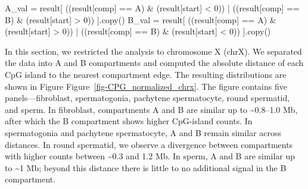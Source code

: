 \documentclass[
  a4paper,
  openany]{scrbook}
\newenvironment{Shaded}{\begin{snugshade}}{\end{snugshade}}
\newcommand{\DecValTok}[1]{\textcolor[rgb]{0.69,0.50,0.00}{#1}}
\newcommand{\NormalTok}[1]{\textcolor[rgb]{0.12,0.11,0.11}{#1}}
\newcommand{\OperatorTok}[1]{\textcolor[rgb]{0.12,0.11,0.11}{#1}}
\newcommand{\StringTok}[1]{\textcolor[rgb]{0.75,0.01,0.01}{#1}}
\begin{document}
\begin{Shaded}
\begin{Highlighting}[]
\NormalTok{    A\_val }\OperatorTok{=}\NormalTok{ result[}
\NormalTok{        ((result[}\StringTok{\textquotesingle{}comp\textquotesingle{}}\NormalTok{] }\OperatorTok{==} \StringTok{\textquotesingle{}A\textquotesingle{}}\NormalTok{) }\OperatorTok{\&}\NormalTok{ (result[}\StringTok{\textquotesingle{}start\textquotesingle{}}\NormalTok{] }\OperatorTok{\textless{}} \DecValTok{0}\NormalTok{)) }\OperatorTok{|}
\NormalTok{        ((result[}\StringTok{\textquotesingle{}comp\textquotesingle{}}\NormalTok{] }\OperatorTok{==} \StringTok{\textquotesingle{}B\textquotesingle{}}\NormalTok{) }\OperatorTok{\&}\NormalTok{ (result[}\StringTok{\textquotesingle{}start\textquotesingle{}}\NormalTok{] }\OperatorTok{\textgreater{}} \DecValTok{0}\NormalTok{))}
\NormalTok{    ].copy()}
\NormalTok{    B\_val }\OperatorTok{=}\NormalTok{ result[}
\NormalTok{        ((result[}\StringTok{\textquotesingle{}comp\textquotesingle{}}\NormalTok{] }\OperatorTok{==} \StringTok{\textquotesingle{}A\textquotesingle{}}\NormalTok{) }\OperatorTok{\&}\NormalTok{ (result[}\StringTok{\textquotesingle{}start\textquotesingle{}}\NormalTok{] }\OperatorTok{\textgreater{}} \DecValTok{0}\NormalTok{)) }\OperatorTok{|}
\NormalTok{        ((result[}\StringTok{\textquotesingle{}comp\textquotesingle{}}\NormalTok{] }\OperatorTok{==} \StringTok{\textquotesingle{}B\textquotesingle{}}\NormalTok{) }\OperatorTok{\&}\NormalTok{ (result[}\StringTok{\textquotesingle{}start\textquotesingle{}}\NormalTok{] }\OperatorTok{\textless{}} \DecValTok{0}\NormalTok{))}
\NormalTok{    ].copy()}
\end{Highlighting}
\end{Shaded}

In this section, we restricted the analysis to chromosome X (chrX). We
separated the data into A and B compartments and computed the absolute
distance of each CpG island to the nearest compartment edge. The
resulting distributions are shown in Figure
Figure~\ref{fig-CPG_normalized_chrx}. The figure contains five
panels---fibroblast, spermatogonia, pachytene spermatocyte, round
spermatid, and sperm. In fibroblast, compartments A and B are similar up
to \textasciitilde0.8--1.0 Mb, after which the B compartment shows
higher CpG-island counts. In spermatogonia and pachytene spermatocyte, A
and B remain similar across distances. In round spermatid, we observe a
divergence between compartments with higher counts between
\textasciitilde0.3 and 1.2 Mb. In sperm, A and B are similar up to
\textasciitilde1 Mb; beyond this distance there is little to no
additional signal in the B compartment.
\end{document}
